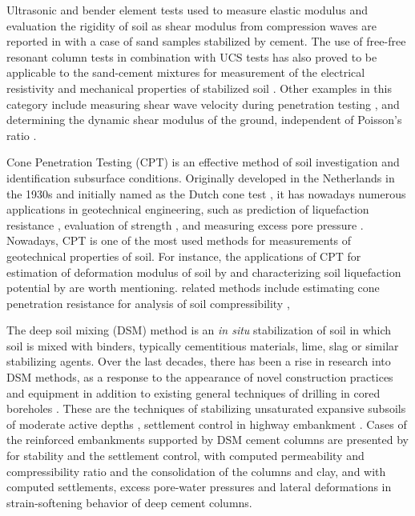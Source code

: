 \documentclass[final,3p,times,twocolumn]{elsarticle}
\begin{document}
Ultrasonic and bender element tests used to measure elastic modulus and evaluation the rigidity of soil as shear modulus from compression waves are reported in \cite{Amaral} with a case of sand samples stabilized by cement. The use of free-free resonant column tests in combination with UCS tests has also proved to be applicable to the sand-cement mixtures for measurement of the electrical resistivity and mechanical properties of stabilized soil \cite{Rusati}. Other examples in this category include measuring shear wave velocity during penetration testing \cite{Hepton1989}, and determining the dynamic shear modulus of the ground, independent of Poisson's ratio \cite{Abbiss}. 

Cone Penetration Testing (CPT) is an effective method of soil investigation and identification subsurface conditions. Originally developed in the Netherlands in the 1930s and initially named as the Dutch cone test \cite{brouwer2007situ,mccallum_2014}, it has nowadays numerous applications in geotechnical engineering, such as prediction of liquefaction resistance \cite{Olsen,Fitzgerald,Saye}, evaluation of strength \cite{Priceetal2016,Jamiolkowski}, and measuring excess pore pressure \cite{SullyCampanella,Elsworthetal2006}. Nowadays, CPT is one of the most used methods for measurements of geotechnical properties of soil. For instance, the applications of CPT for estimation of deformation modulus of soil by \cite{SHAHIEN2013633,BENZNAVARRETE2022289} and characterizing soil liquefaction potential by \cite{GUAN20221221} are worth mentioning. related methods include estimating cone penetration resistance for analysis of soil compressibility \cite{Bishtetal2021}, 

The deep soil mixing (DSM) method is an \emph{in situ} stabilization of soil in which soil is mixed with binders, typically cementitious materials, lime, slag or similar stabilizing agents. Over the last decades, there has been a rise in research into DSM methods, as a response to the appearance of novel construction practices and equipment in addition to existing general techniques of drilling in cored boreholes \cite{Hepton}. These are the techniques of stabilizing unsaturated expansive subsoils of moderate active depths \cite{MadhyannapuPuppala,Madhyannapu}, settlement control in highway embankment \cite{Archeewa}. Cases of the reinforced embankments supported by DSM cement columns are presented by \cite{Lambrechts} for stability and the settlement control, \cite{Bergado}
with computed permeability and compressibility ratio and the consolidation of the columns and clay, and \cite{Yapageetal2014} with computed settlements, excess pore-water pressures and lateral deformations in strain-softening behavior of deep cement columns.
\end{document}
